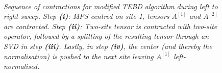 \begin{figure}
\centering %
\begin{subfigure}[b]{0.35\textwidth}
	\caption{}  
  	
\end{subfigure}
\begin{subfigure}[b]{0.35\textwidth}
	\caption{}    
  	
\end{subfigure}
\\ %
\vspace{10mm}
\begin{subfigure}[b]{0.35\textwidth}
	\caption{}    	
  	
\end{subfigure}
\begin{subfigure}[b]{0.35\textwidth}
	\caption{}  
  	
\end{subfigure}
\caption{\textit{Sequence of contractions for modified TEBD algorithm during left to right sweep. Step \textbf{(i)}: MPS centred on site 1, tensors $A^{[1]}$ and $A^{[2]}$ are contracted. Step \textbf{(ii)}: Two-site tensor is contracted with two-site operator, followed by a splitting of the resulting tensor through an SVD in step \textbf{(iii)}. Lastly, in step \textbf{(iv)}, the center (and thereby the normalisation) is pushed to the next site leaving $A^{[1]}$ left-normalised.}}
\label{fig:TEBDContraction}
\end{figure}